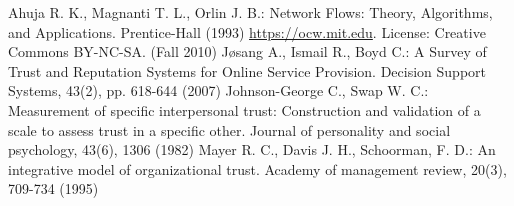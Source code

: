\begin{thebibliography}{40}
   Ahuja R. K., Magnanti T. L., Orlin J. B.: Network Flows: Theory, Algorithms, and Applications. Prentice-Hall (1993)
   \url{https://ocw.mit.edu}. License: Creative Commons BY-NC-SA. (Fall 2010)
   J\o{}sang A., Ismail R., Boyd C.: A Survey of Trust and Reputation Systems for Online Service Provision. Decision
   Support Systems, 43(2), pp. 618-644 (2007)
   Johnson-George C., Swap W. C.: Measurement of specific interpersonal trust: Construction and validation of a scale to
   assess trust in a specific other. Journal of personality and social psychology, 43(6), 1306 (1982)
   Mayer R. C., Davis J. H., Schoorman, F. D.: An integrative model of organizational trust. Academy of management review,
   20(3), 709-734 (1995)
\end{thebibliography}

